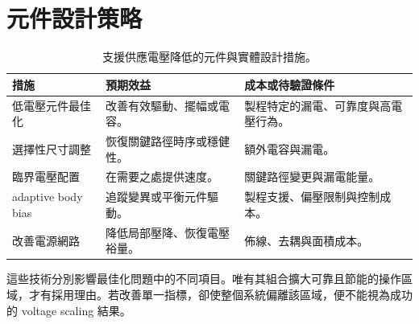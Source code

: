\clearpage
\section{元件設計策略}
\begin{table}[H]
\centering\tablebegin
\caption{支援供應電壓降低的元件與實體設計措施。}
\begin{tabularx}{\textwidth}{@{}p{}YY@{}}
\toprule 措施 & 預期效益 & 成本或待驗證條件 \\\midrule
低電壓元件最佳化 & 改善有效驅動、擺幅或電容。 & 製程特定的漏電、可靠度與高電壓行為。 \\
選擇性尺寸調整 & 恢復關鍵路徑時序或穩健性。 & 額外電容與漏電。 \\
臨界電壓配置 & 在需要之處提供速度。 & 關鍵路徑變更與漏電能量。 \\
 adaptive body bias & 追蹤變異或平衡元件驅動。 & 製程支援、偏壓限制與控制成本。 \\
改善電源網路 & 降低局部壓降、恢復電壓裕量。 & 佈線、去耦與面積成本。 \\\bottomrule
\end{tabularx}
\end{table}

這些技術分別影響最佳化問題中的不同項目。唯有其組合擴大可靠且節能的操作區域，才有採用理由。若改善單一指標，卻使整個系統偏離該區域，便不能視為成功的 voltage scaling 結果。


